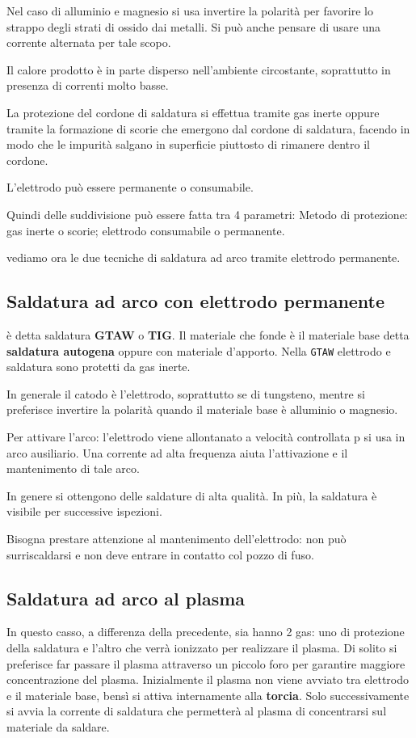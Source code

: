 Nel caso di alluminio e magnesio si usa invertire la polarità per favorire lo strappo degli strati di ossido dai metalli.
Si può anche pensare di usare una corrente alternata per tale scopo.

Il calore prodotto è in parte disperso nell'ambiente circostante, soprattutto in presenza di correnti molto basse.

La protezione del cordone di saldatura si effettua tramite gas inerte oppure tramite la formazione di scorie che emergono dal cordone di saldatura, facendo in modo che le impurità salgano in superficie piuttosto di rimanere dentro il cordone.

L'elettrodo può essere permanente o consumabile.

Quindi delle suddivisione può essere fatta tra 4 parametri: Metodo di protezione: gas inerte o scorie; elettrodo consumabile o permanente.


vediamo ora le due tecniche di saldatura ad arco tramite elettrodo permanente.

\subsection{Saldatura ad arco con elettrodo permanente}
è detta saldatura \textbf{GTAW} o \textbf{TIG}.
Il materiale che fonde è il materiale base detta \textbf{saldatura autogena} oppure con materiale d'apporto.
Nella \texttt{GTAW} elettrodo e saldatura sono protetti da gas inerte.

In generale il catodo è l'elettrodo, soprattutto se di tungsteno, mentre si preferisce invertire la polarità quando il materiale base è alluminio o magnesio.

Per attivare l'arco: l'elettrodo viene allontanato a velocità controllata p si usa in arco ausiliario.
Una corrente ad alta frequenza aiuta l'attivazione e il mantenimento di tale arco.

In genere si ottengono delle saldature di alta qualità.
In più, la saldatura è visibile per successive ispezioni.

Bisogna prestare attenzione al mantenimento dell'elettrodo: non può surriscaldarsi e non deve entrare in contatto col pozzo di fuso.

\subsection{Saldatura ad arco al plasma}
In questo casso, a differenza della precedente, sia hanno 2 gas: uno di protezione della saldatura e l'altro che verrà ionizzato per realizzare il plasma.
Di solito si preferisce far passare il plasma attraverso un piccolo foro per garantire maggiore concentrazione del plasma.
Inizialmente il plasma non viene avviato tra elettrodo e il materiale base, bensì si attiva internamente alla \textbf{torcia}. Solo successivamente si avvia la corrente di saldatura che permetterà al plasma di concentrarsi sul materiale da saldare.

